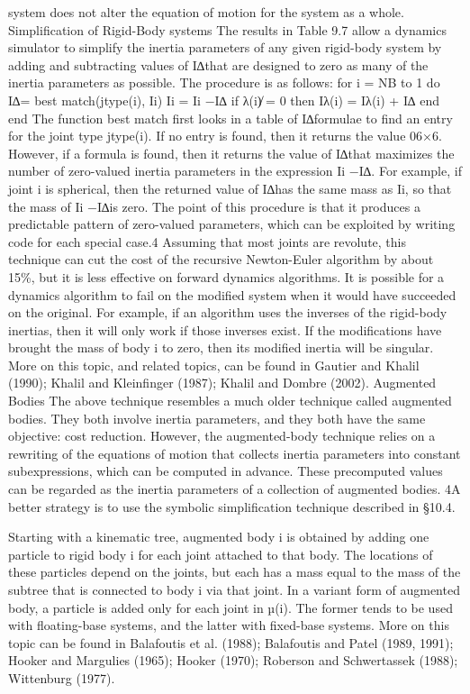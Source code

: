 system does not alter the equation of motion for the system as a whole. Simplification of Rigid-Body systems The results in Table 9.7 allow a dynamics simulator to simplify the inertia parameters of any given rigid-body system by adding and subtracting values of I∆that are designed to zero as many of the inertia parameters as possible. The procedure is as follows: for i = NB to 1 do I∆= best match(jtype(i), Ii) Ii = Ii −I∆ if λ(i)̸ = 0 then Iλ(i) = Iλ(i) + I∆ end end The function best match first looks in a table of I∆formulae to find an entry for the joint type jtype(i). If no entry is found, then it returns the value 06×6. However, if a formula is found, then it returns the value of I∆that maximizes the number of zero-valued inertia parameters in the expression Ii −I∆. For example, if joint i is spherical, then the returned value of I∆has the same mass as Ii, so that the mass of Ii −I∆is zero. The point of this procedure is that it produces a predictable pattern of zero-valued parameters, which can be exploited by writing code for each special case.4 Assuming that most joints are revolute, this technique can cut the cost of the recursive Newton-Euler algorithm by about 15\%, but it is less effective on forward dynamics algorithms. It is possible for a dynamics algorithm to fail on the modified system when it would have succeeded on the original. For example, if an algorithm uses the inverses of the rigid-body inertias, then it will only work if those inverses exist. If the modifications have brought the mass of body i to zero, then its modified inertia will be singular. More on this topic, and related topics, can be found in Gautier and Khalil (1990); Khalil and Kleinfinger (1987); Khalil and Dombre (2002). Augmented Bodies The above technique resembles a much older technique called augmented bodies. They both involve inertia parameters, and they both have the same objective: cost reduction. However, the augmented-body technique relies on a rewriting of the equations of motion that collects inertia parameters into constant subexpressions, which can be computed in advance. These precomputed values can be regarded as the inertia parameters of a collection of augmented bodies. 4A better strategy is to use the symbolic simplification technique described in §10.4.

Starting with a kinematic tree, augmented body i is obtained by adding one particle to rigid body i for each joint attached to that body. The locations of these particles depend on the joints, but each has a mass equal to the mass of the subtree that is connected to body i via that joint. In a variant form of augmented body, a particle is added only for each joint in µ(i). The former tends to be used with floating-base systems, and the latter with fixed-base systems. More on this topic can be found in Balafoutis et al. (1988); Balafoutis and Patel (1989, 1991); Hooker and Margulies (1965); Hooker (1970); Roberson and Schwertassek (1988); Wittenburg (1977).
